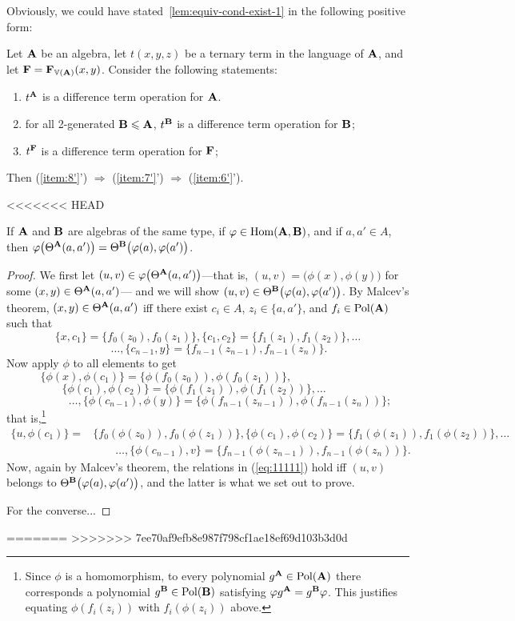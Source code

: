 Obviously, we could have stated~\ref{lem:equiv-cond-exist-1} in the following positive form:
\begin{cor}
  Let $\mathbf{A}$ be an algebra, let $t(x,y,z)$ be a ternary term in the language
  of $\mathbf{A}$, and let $\mathbf{F} = \mathbf{F}_{\operatorname{\mathbb{V}}(\mathbf{A})}(x,y)$. Consider the following statements:
  \begin{enumerate}[(A')]
  \item \label{item:6'} $t^{\mathbf{A}}$ is a difference term operation for $\mathbf{A}$.
  \item \label{item:7'} for all 2-generated $\mathbf{B} \leqslant \mathbf{A}$,
    $t^{\mathbf{B}}$ is a difference term operation for $\mathbf{B}$;
  \item \label{item:8'} $t^{\mathbf{F}}$ is a difference term operation for $\mathbf{F}$;
  \end{enumerate}
  Then (\ref{item:8'}') $\Rightarrow$ (\ref{item:7'}') $\Rightarrow$ (\ref{item:6'}').
\end{cor}

<<<<<<< HEAD
\begin{lem}
If $\mathbf{A}$ and $\mathbf{B}$ are algebras of the same type, if 
$\varphi \in \operatorname{Hom}(\mathbf{A}, \mathbf{B})$, and if $a, a' \in A$, then 
$\varphi \bigl(\Theta^{\mathbf{A}}(a,a')\bigr) =\Theta^{\mathbf{B}}\bigl(\varphi (a),\varphi(a')\bigr)$.
\end{lem}
\begin{proof}
We first let $(u,v) \in \varphi \bigl(\Theta^{\mathbf{A}}(a,a')\bigr)$---that is,
$(u,v) = \bigl(\phi (x),\phi(y)\bigr)$ for some  $(x,y) \in \Theta^{\mathbf{A}}(a,a')$---
and we will show $(u,v) \in \Theta^{\mathbf{B}}\bigl(\varphi (a),\varphi(a')\bigr)$.
By Malcev's theorem, $(x,y) \in \Theta^{\mathbf{A}}(a,a')$ iff there exist
$c_i\in A$, $z_i \in \{a, a'\}$, and $f_i\in \operatorname{Pol}(\mathbf{A})$ 
such that 
\[
\{x, c_1\} = \{f_0(z_0), f_0(z_1)\}, 
\{c_1, c_2\} = \{f_1(z_1), f_1(z_2)\}, 
\dots
\]
\[ 
\qquad \dots, \{c_{n-1}, y\} = \{f_{n-1}(z_{n-1}), f_{n-1}(z_n)\}.
\] 
Now apply $\phi$ to all elements to get 
\[
\{\phi(x), \phi(c_1)\} = \{\phi(f_0(z_0)), \phi(f_0(z_1))\}, \phantom{XXXXXXXXX}
\]
\[
\{\phi(c_1), \phi(c_2)\} = \{\phi(f_1(z_1)), \phi(f_1(z_2))\},\dots
 \phantom{XXX}
\]
\[ 
\qquad\qquad \dots, 
\{\phi(c_{n-1}), \phi(y)\} = \{\phi(f_{n-1}(z_{n-1})), \phi(f_{n-1}(z_n))\};
\] 
that is,\footnote{Since $\phi$ is a homomorphism, to every polynomial 
$g^{\mathbf{A}} \in \operatorname{Pol}(\mathbf{A})$ there corresponds a polynomial 
$g^{\mathbf{B}} \in \operatorname{Pol}(\mathbf{B})$ satisfying 
$\varphi g^{\mathbf{A}} = g^{\mathbf{B}}\varphi$.  This justifies equating
$\phi(f_{i}(z_{i}))$ with $f_{i}(\phi(z_{i}))$ above.}
\begin{align}
  \label{eq:11111}
\{u, \phi(c_1)\} =& \{f_0(\phi(z_0)), f_0(\phi(z_1))\}, 
\{\phi(c_1), \phi(c_2)\} = \{f_1(\phi(z_1)), f_1(\phi(z_2))\}, 
\dots \nonumber\\
&\qquad \dots, 
\{\phi(c_{n-1}), v\} = \{f_{n-1}(\phi(z_{n-1})), f_{n-1}(\phi(z_n))\}.
\end{align}
Now, again by Malcev's theorem, the relations in (\ref{eq:11111})
hold iff $(u,v)$ belongs to $\Theta^{\mathbf{B}}\bigl(\varphi (a),\varphi(a')\bigr)$, 
and the latter is what we set out to prove.

For the converse...
\end{proof}
=======
>>>>>>> 7ee70af9efb8e987f798cf1ae18ef69d103b3d0d

